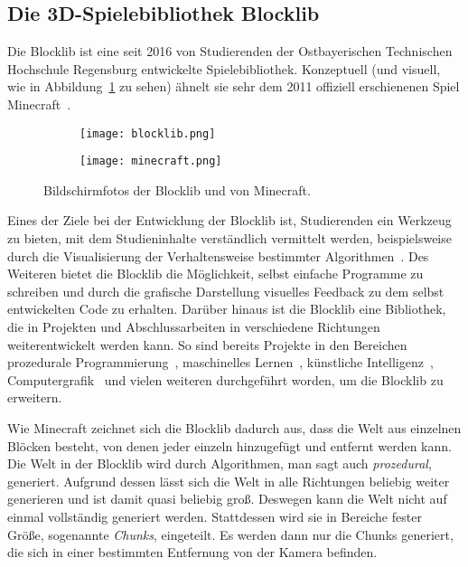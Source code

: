 \subsection{Die 3D-Spielebibliothek Blocklib}
Die Blocklib ist eine seit 2016 von Studierenden der Ostbayerischen Technischen Hochschule Regensburg entwickelte Spielebibliothek. Konzeptuell (und visuell, wie in Abbildung~\ref{fig:blocklibminecraft} zu sehen) ähnelt sie sehr dem 2011 offiziell erschienenen Spiel Minecraft~\cite{Mojang}.
\begin{figure}[!htbp]
	\begin{subfigure}[b]{.49\textwidth}
		\texttt{[image: blocklib.png]}
	\end{subfigure}
	\begin{subfigure}[b]{.49\textwidth}
		\texttt{[image: minecraft.png]}
	\end{subfigure}
	\caption{Bildschirmfotos der Blocklib und von Minecraft.}\label{fig:blocklibminecraft}
\end{figure}
Eines der Ziele bei der Entwicklung der Blocklib ist, Studierenden ein Werkzeug zu bieten, mit dem Studieninhalte verständlich vermittelt werden,  beispielsweise durch die Visualisierung der Verhaltensweise bestimmter Algorithmen~\cite{Helgert2018}. Des Weiteren bietet die Blocklib die Möglichkeit, selbst einfache Programme zu schreiben und durch die grafische Darstellung visuelles Feedback zu dem selbst entwickelten Code zu erhalten. Darüber hinaus ist die Blocklib eine Bibliothek, die in Projekten und Abschlussarbeiten in verschiedene Richtungen weiterentwickelt werden kann. So sind bereits Projekte in den Bereichen prozedurale Programmierung~\cite{Beer2017,Ebbinger2018a,Kalle2018,Sellner2020,Kohler2021}, maschinelles Lernen~\cite{Mayer2021}, künstliche Intelligenz~\cite{Amthor2017,Weidner2018,Bunke2021,Mayer2021}, Computergrafik~\cite{Zink2016,Ebbinger2018,Werner2018} und vielen weiteren durchgeführt worden, um die Blocklib zu erweitern.

Wie Minecraft zeichnet sich die Blocklib dadurch aus, dass die Welt aus einzelnen Blöcken besteht, von denen jeder einzeln hinzugefügt und entfernt werden kann. Die Welt in der Blocklib wird durch Algorithmen, man sagt auch \emph{prozedural}, generiert. Aufgrund dessen lässt sich die Welt in alle Richtungen beliebig weiter generieren und ist damit quasi beliebig groß. Deswegen kann die Welt nicht auf einmal vollständig generiert werden. Stattdessen wird sie in Bereiche fester Größe, sogenannte \emph{Chunks}, eingeteilt. Es werden dann nur die Chunks generiert, die sich in einer bestimmten Entfernung von der Kamera befinden.

